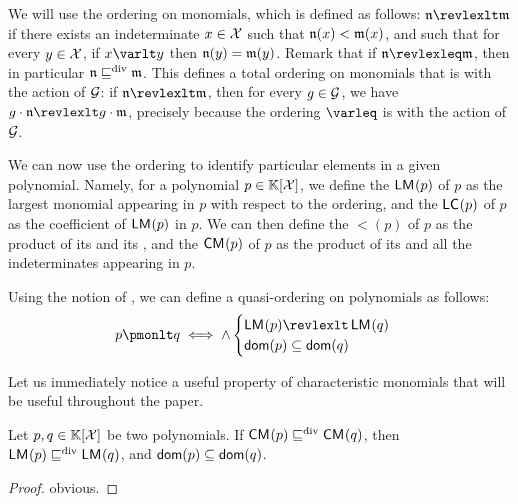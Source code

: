 \AP We will use the  ordering on monomials, which is defined as
follows: $\monelt[n] \revlexlt \monelt[m]$ if there exists an indeterminate $x
\in \mathcal{X}$ such that $\monelt[n](x) < \monelt[m](x)$, and such that for every $y
\in \mathcal{X}$, if $x \varlt y$ then $\monelt[n](y) = \monelt[m](y)$. Remark that if
$\monelt[n] \revlexleq \monelt[m]$, then in particular $\monelt[n] \divleq
\monelt[m]$. This defines a total ordering on monomials that is 
with the action of $\mathcal{G}$: if $\monelt[n] \revlexlt \monelt[m]$, then for
every $g \in \mathcal{G}$, we have $g \cdot \monelt[n] \revlexlt g \cdot
\monelt[m]$, precisely because the ordering $\varleq$ is  with
the action of $\mathcal{G}$.

\AP We can now use the  ordering to identify particular elements in
a given polynomial. Namely, for a polynomial $p \in \mathbb{K}[\mathcal{X}]$, we define
the  $\mathop{\mathsf{LM}_{}}(p)$ of $p$ as the largest monomial appearing
in $p$ with respect to the  ordering, and the  $\mathsf{LC}_{}(p)$ of $p$ as the coefficient of $\mathop{\mathsf{LM}_{}}(p)$ in $p$. We can then
define the  $\lt(p)$ of $p$ as the product of its
 and its , and the
 $\mathop{\mathsf{CM}_{}}(p)$ of $p$ as the product of its
 and all the indeterminates appearing in $p$. 


\AP Using the notion of , we can define a quasi-ordering
on polynomials as follows: 
\begin{equation}
  \label{eq:chm}
  p \pmonlt q \iff
  \mathop{\land}
  \begin{cases}
    \lm(p) \revlexlt \lm(q) \\
    \dom(p) \subseteq \dom(q) \\
  \end{cases}
\end{equation}

Let us immediately notice a useful property of characteristic monomials
that will be useful throughout the paper. 

\begin{lemma}
  \label{lem:chm-compat}
  Let $p,q \in \mathbb{K}[\mathcal{X}]$ be two polynomials. 
  If $\mathop{\mathsf{CM}_{}}(p) \mathrel{\sqsubseteq^{\mathrm{div}}} \mathop{\mathsf{CM}_{}}(q)$, 
  then $\mathop{\mathsf{LM}_{}}(p) \mathrel{\sqsubseteq^{\mathrm{div}}} \mathop{\mathsf{LM}_{}}(q)$, and $\mathsf{dom}(p) \subseteq \mathsf{dom}(q)$.
\end{lemma}
\begin{proof}
  obvious.
\end{proof}

